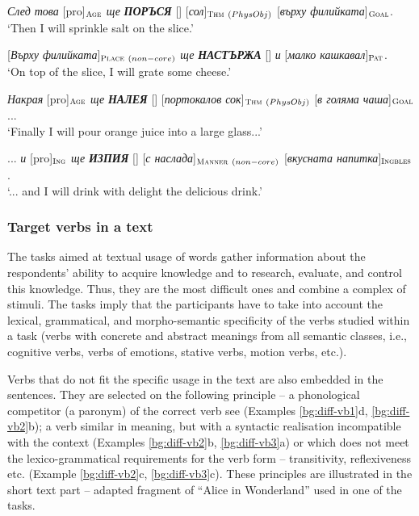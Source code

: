 \documentclass[output=paper,colorlinks,citecolor=brown]{langscibook}
\begin{document}
\begin{exe}
\ex \label{bg:diff-vb1m} \textit{След това} [pro]$_{\text{\textsc{Age}}}$ \textit{ще} \textit{\textbf{\uppercase{поръся}}} [] [\textit{сол}]$_{\text{\textsc{Thm}}\ (PhysObj)}$ [\textit{върху фи\-лийката}]$_{\text{\textsc{Goal}}}$.\\[-0.8em]  
\glt `Then I  will sprinkle salt on the slice.'

\ex \label{bg:diff-vb1g}  [\textit{Върху филийката}]$_{\feinsub{Place}\ (non-core)}$ \textit{ще} \textit{\textbf{\uppercase{настържа}}} [] \textit{и} [\textit{малко кашкавал}]$_{\text{\textsc{Pat}}}$.\\[-0.8em]
\glt `On top of the slice, I will grate some cheese.'
  
    \ex \label{bg:diff-vb1h} \textit{Накрая} [pro]$_{\text{\textsc{Age}}}$ \textit{ще} \textit{\textbf{\uppercase{налея}}} [] [\textit{портокалов сок}]$_{\text{\textsc{Thm}}\ (PhysObj)}$ [\textit{в голяма чаша}]$_{\text{\textsc{Goal}}}$...\\[-0.8em]
\glt `Finally I will pour orange juice into a large glass...'

\ex ... \textit{и} [pro]$_{\text{\textsc{Ing}}}$ \textit{ще} \textit{\textbf{\uppercase{изпия}}} [] [\textit{с наслада}]$_{\text{\textsc{Manner}}\ (non-core)}$ [\textit{вкус\-ната напитка}]$_{\text{\textsc{Ingbles}}}$.\\[-0.8em]
\glt `... and I  will drink  with delight the delicious drink.'
\end{exe}


\subsubsection{Target verbs in a text}\label{subsubsect:4.3.2}

The tasks aimed at textual usage of words gather information about the respondents' ability to acquire knowledge and to research, evaluate, and control this knowledge. Thus, they are the most difficult ones and combine a complex of stimuli. The tasks imply that the participants have to take into account the lexical, grammatical, and morpho-semantic specificity of the verbs studied within a task (verbs with concrete and abstract meanings from all semantic classes, i.e., cognitive verbs, verbs of emotions, stative verbs, motion verbs, etc.).

Verbs that do not fit the specific usage in the text are also embedded in the sentences. They are selected on the following principle -- a phonological competitor (a paronym) of the correct verb see (Examples \ref{bg:diff-vb1}d, \ref{bg:diff-vb2}b); a verb similar in meaning, but with a syntactic realisation incompatible with the context (Examples \ref{bg:diff-vb2}b, \ref{bg:diff-vb3}a) or which does not meet the lexico-grammatical requirements for the verb form -- transitivity, reflexiveness etc. (Example \ref{bg:diff-vb2}c, \ref{bg:diff-vb3}c). These principles are illustrated in the short text part -- adapted fragment of ``Alice in Wonderland'' used in one of the tasks.
\end{document}
